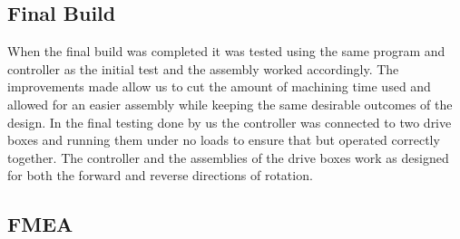 \subsection{Final Build}
When the final build was completed it was tested using the same program and controller as the initial test and the assembly worked accordingly. The improvements made allow us to cut the amount of machining time used and allowed for an easier assembly while keeping the same desirable outcomes of the design. In the final testing done by us the controller was connected to two drive boxes and running them under no loads to ensure that but operated correctly together. The controller and the assemblies of the drive boxes work as designed for both the forward and reverse directions of rotation.

\subsection{FMEA}

